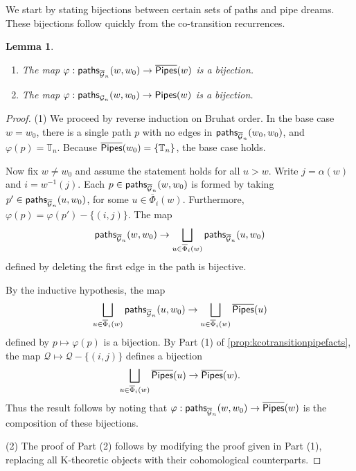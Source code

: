 \documentclass[12 pt]{amsart}
\newcommand{\paths}{{\sf paths}}
\newcommand{\addable}{\alpha}
\newtheorem{lemma}[Theorem]{Lemma}
\numberwithin{equation}{section}
\theoremstyle{remark}
\newcommand{\pipes}{{\sf Pipes}}
\newcommand{\kpipes}{\overline{\sf Pipes}}
\newcommand{\kcotransitionperms}{\overline{\Phi}}
\begin{document}
	
	
	We start by stating bijections between certain sets of paths and pipe dreams. These bijections follow quickly from the co-transition recurrences.  
		
		\begin{lemma}
			\label{lemma:graphbijections}
		\begin{enumerate}
		\item The map 
		$\varphi:\paths_{\overline{\mathcal{G}}_n}(w,w_0)\rightarrow \kpipes(w)$ is a bijection.
		\item The map 
		$\varphi:\paths_{\mathcal{G}_n}(w,w_0)\rightarrow \pipes(w)$ is a bijection.
		\end{enumerate}
		\end{lemma}
		
		\begin{proof}
			
		\noindent (1) We proceed by reverse induction on Bruhat order. In the base case $w=w_0$, there is a single path $p$ with no edges in $\paths_{\overline{\mathcal{G}}_n}(w_0,w_0)$, and $\varphi(p)=\mathbb T_n$. Because $\kpipes(w_0)=\{\mathbb T_n\}$, the base case holds.
		
		Now fix $w\neq w_0$ and assume the statement holds for all $u>w$. Write $j=\addable(w)$ and $i=w^{-1}(j)$. 
		Each $p\in \paths_{\overline{\mathcal{G}}_n}(w,w_0)$ is formed by taking $p'\in \paths_{\overline{\mathcal{G}}_n}(u,w_0)$, for some $u\in \kcotransitionperms_{i}(w)$. 
		Furthermore, $\varphi(p)=\varphi(p')-\{(i,j)\}$. 
		The map 
		\[\paths_{\overline{\mathcal{G}}_n}(w,w_0)\rightarrow \bigsqcup_{u \in \kcotransitionperms_i(w)} \paths_{\overline{\mathcal{G}}_n}(u,w_0) \]
		defined by deleting the first edge in the path is bijective.

		By the inductive hypothesis, the map
		\[\bigsqcup_{u \in \kcotransitionperms_i(w)} \paths_{\overline{\mathcal{G}}_n}(u,w_0)\rightarrow \bigsqcup_{u \in \kcotransitionperms_i(w)} \kpipes(u)\]
		defined by $p\mapsto \varphi(p)$
		is a bijection.
		By Part (1) of \cref{prop:kcotransitionpipefacts}, the map $\mathcal Q\mapsto \mathcal Q- \{(i,j)\}$ defines a bijection 
		\[\bigsqcup_{u \in \kcotransitionperms_i(w)} \kpipes(u)\rightarrow \kpipes(w).\]
		Thus the result follows by noting that $\varphi:\paths_{\overline{\mathcal{G}}_n}(w,w_0)\rightarrow \kpipes(w)$ is the composition of these bijections.	
		
		
		\noindent (2) The proof of Part (2) follows by modifying the proof given in Part (1), replacing all K-theoretic objects with their cohomological counterparts.  
		\end{proof}
	
\end{document}
